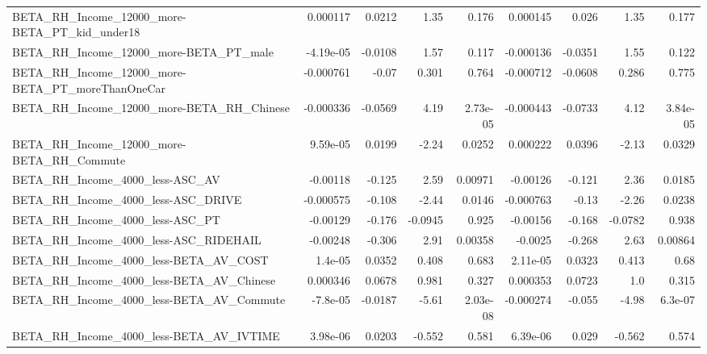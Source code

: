 \begin{tabular}{lrrrrrrrr}
BETA\_RH\_Income\_12000\_more-BETA\_PT\_kid\_under18      &    0.000117 &       0.0212 &      1.35 &    0.176 &   0.000145 &       0.026 &         1.35 &         0.177 \\
BETA\_RH\_Income\_12000\_more-BETA\_PT\_male             &   -4.19e-05 &      -0.0108 &      1.57 &    0.117 &  -0.000136 &     -0.0351 &         1.55 &         0.122 \\
BETA\_RH\_Income\_12000\_more-BETA\_PT\_moreThanOneCar   &   -0.000761 &        -0.07 &     0.301 &    0.764 &  -0.000712 &     -0.0608 &        0.286 &         0.775 \\
BETA\_RH\_Income\_12000\_more-BETA\_RH\_Chinese          &   -0.000336 &      -0.0569 &      4.19 & 2.73e-05 &  -0.000443 &     -0.0733 &         4.12 &      3.84e-05 \\
BETA\_RH\_Income\_12000\_more-BETA\_RH\_Commute          &    9.59e-05 &       0.0199 &     -2.24 &   0.0252 &   0.000222 &      0.0396 &        -2.13 &        0.0329 \\
BETA\_RH\_Income\_4000\_less-ASC\_AV                    &    -0.00118 &       -0.125 &      2.59 &  0.00971 &   -0.00126 &      -0.121 &         2.36 &        0.0185 \\
BETA\_RH\_Income\_4000\_less-ASC\_DRIVE                 &   -0.000575 &       -0.108 &     -2.44 &   0.0146 &  -0.000763 &       -0.13 &        -2.26 &        0.0238 \\
BETA\_RH\_Income\_4000\_less-ASC\_PT                    &    -0.00129 &       -0.176 &   -0.0945 &    0.925 &   -0.00156 &      -0.168 &      -0.0782 &         0.938 \\
BETA\_RH\_Income\_4000\_less-ASC\_RIDEHAIL              &    -0.00248 &       -0.306 &      2.91 &  0.00358 &    -0.0025 &      -0.268 &         2.63 &       0.00864 \\
BETA\_RH\_Income\_4000\_less-BETA\_AV\_COST              &     1.4e-05 &       0.0352 &     0.408 &    0.683 &   2.11e-05 &      0.0323 &        0.413 &          0.68 \\
BETA\_RH\_Income\_4000\_less-BETA\_AV\_Chinese           &    0.000346 &       0.0678 &     0.981 &    0.327 &   0.000353 &      0.0723 &          1.0 &         0.315 \\
BETA\_RH\_Income\_4000\_less-BETA\_AV\_Commute           &    -7.8e-05 &      -0.0187 &     -5.61 & 2.03e-08 &  -0.000274 &      -0.055 &        -4.98 &       6.3e-07 \\
BETA\_RH\_Income\_4000\_less-BETA\_AV\_IVTIME            &    3.98e-06 &       0.0203 &    -0.552 &    0.581 &   6.39e-06 &       0.029 &       -0.562 &         0.574 \\

\end{tabular}
